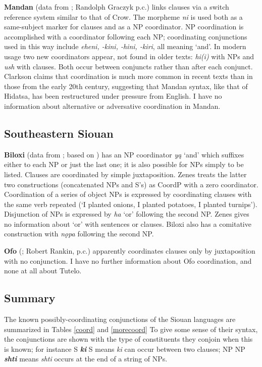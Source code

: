 \documentclass[output=paper]{LSP/langsci}
\begin{document}
\textbf{Mandan} (data from \citealt{Clarkson2012}; Randolph Graczyk p.c.) links clauses via a switch reference system similar to that of Crow. The morpheme \textit{ni} is used both as a same-subject marker for clauses and as a NP coordinator. NP coordination is accomplished with a coordinator following each NP; coordinating conjunctions used in this way include \textit{eheni, -kini, -hini, -kiri}, all meaning `and'. In modern usage two new coordinators appear, not found in older texts: \textit{hi(i)} with NPs and \textit{ush} with clauses. Both occur between conjuncts rather than after each conjunct. Clarkson claims that coordination is much more common in recent texts than in those from the early 20th century, suggesting that Mandan syntax, like that of Hidatsa, has been restructured under pressure from English. I have no information about alternative or adversative coordination in Mandan.  

\subsection{Southeastern Siouan}
 
\textbf{Biloxi} (data from \citealt{Zenes2009}; based on   \citealt{DorseySwanton1912}) has an NP coordinator \textit{y\k{a}} `and' which suffixes either to each NP or just the last one; it is also possible for NPs simply to be listed. Clauses are coordinated by simple juxtaposition. Zenes treats the latter two constructions (concatenated NPs and S's) as CoordP with a zero coordinator. Coordination of a series of object NPs is expressed by coordinating clauses with the same verb repeated (`I planted onions, I planted potatoes, I planted turnips'). Disjunction of NPs is expressed by \textit{ha} `or' following the second NP. Zenes gives no information about `or' with sentences or clauses. Biloxi also has a comitative construction with \textit{n\k{o}pa} following the second NP.

\textbf{Ofo} (\citealt{DorseySwanton1912}; Robert Rankin, p.c.) apparently coordinates clauses only by juxtaposition with no conjunction. I have no further information about Ofo coordination, and none at all about Tutelo.

\subsection{Summary}

The known possibly-coordinating conjunctions of the Siouan languages are summarized in Tables \ref{coord} and \ref{morecoord} To give some sense of their syntax, the conjunctions are shown with the type of constituents they conjoin when this is known; for instance S \textit{\textbf{ki}} S means \textit{ki} can occur between two clauses; NP NP \textit{\textbf {shti}} means \textit {shti} occurs at the end of a string of NPs.
\end{document}
